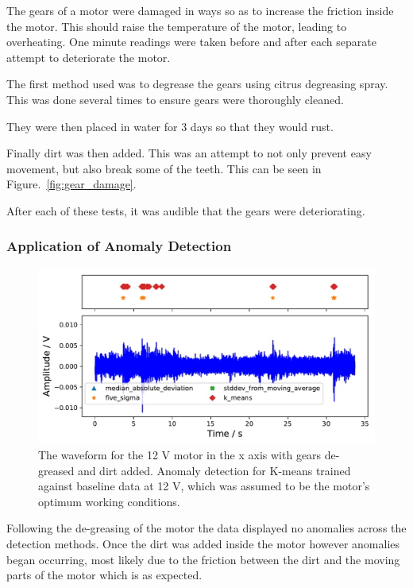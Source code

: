 The gears of a motor were damaged in ways so as to increase the friction inside the motor. This should raise the temperature of the motor, leading to overheating. One minute readings were taken before and after each separate attempt to deteriorate the motor. 

The first method used was to degrease the gears using citrus degreasing spray. This was done several times to ensure gears were thoroughly cleaned.

They were then placed in water for 3 days so that they would rust.

Finally dirt was then added. This was an attempt to not only prevent easy movement, but also break some of the teeth. This can be seen in Figure.~\ref{fig:gear_damage}.

After each of these tests, it was audible that the gears were deteriorating. 


\subsubsection{Application of Anomaly Detection}

\begin{figure}[t]
    \includegraphics[width=1.0\textwidth]{fig/WD40_dry_dirt_12V_motornorm12V.pdf}
    \caption[Anomaly Tests 12 V Motor with Dirt]{The waveform for the 12 V motor in the x axis with gears de-greased and dirt added. Anomaly detection for K-means trained against baseline data at 12 V, which was assumed to be the motor's optimum working conditions.}
    \label{fig:12V_dirt}
\end{figure}

Following the de-greasing of the motor the data displayed no anomalies across the detection methods. Once the dirt was added inside the motor however anomalies began occurring, most likely due to the friction between the dirt and the moving parts of the motor which is as expected.

